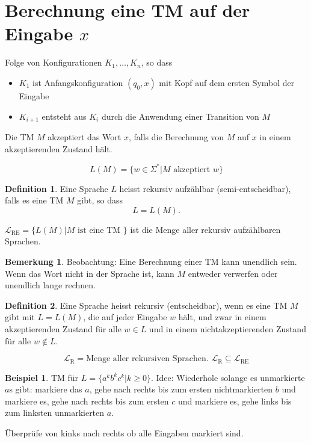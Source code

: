\documentclass[11pt]{article} %
\theoremstyle{definition}
\newtheorem*{beispiel}{Beispiel}
\newtheorem{definition}{Definition}
\newtheorem*{bemerkung}{Bemerkung}
\begin{document}
\section{Berechnung eine TM auf der Eingabe $x$}

Folge von Konfigurationen $K_1, \dots, K_n$, so dass
\begin{itemize}
\item $K_1$ ist Anfangskonfiguration $(q_0, x)$ mit Kopf auf dem ersten Symbol der Eingabe
\item $K_{i+1}$ entsteht aus $K_i$ durch die Anwendung einer Transition von $M$

\end{itemize}

Die TM $M$ akzeptiert das Wort $x$, falls die Berechnung von $M$ auf $x$ in einem akzeptierenden Zustand hält.

\[
L(M) = \{w \in \Sigma^* | M \textrm{ akzeptiert } w \}
\]


\begin{definition}
Eine Sprache $L$ heisst rekursiv aufzählbar (semi-entscheidbar), falls es eine TM $M$ gibt, so dass
\[
L = L(M).
\]

$\mathcal{L}_{\textrm{RE}} = \{L(M) | M \textrm{ ist eine TM } \}$ ist die Menge aller rekursiv aufzählbaren Sprachen.

\end{definition}

\begin{bemerkung}
Beobachtung: Eine Berechnung einer TM kann unendlich sein. Wenn das Wort nicht in der Sprache ist, kann $M$ entweder verwerfen oder unendlich lange rechnen.
\end{bemerkung}

\begin{definition}
Eine Sprache heisst rekursiv (entscheidbar), wenn es eine TM $M$ gibt mit $L= L(M)$, die auf jeder Eingabe $w$ hält, und zwar in einem akzeptierenden Zustand für alle $w \in L$ und in einem nichtakzeptierenden Zustand für alle $w \notin L$.

\[
\mathcal{L}_\textrm{R} = \textrm{Menge aller rekursiven Sprachen. } \mathcal{L}_\textrm{R} \subseteq \mathcal{L}_\textrm{RE}
\]
\end{definition}

\begin{beispiel} TM für $L = \{a^kb^kc^k | k \ge 0\}$. Idee: Wiederhole solange  es unmarkierte $a$s gibt: markiere das $a$, gehe nach rechts bis zum ersten nichtmarkierten $b$ und markiere es, gehe nach rechts bis zum ersten $c$ und markiere es, gehe links bis zum linksten unmarkierten $a$.

Überprüfe von kinks nach rechts ob alle Eingaben markiert sind.

\end{beispiel}
\end{document}
